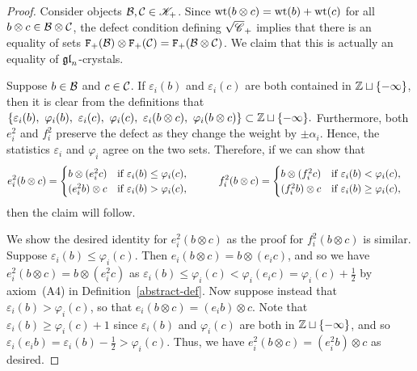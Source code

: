 \documentclass[11pt]{article}
\begin{document}
\begin{proof}
Consider objects $\cB,\cC\in \sK_+$.
Since $\weight(b\otimes c) = \weight(b) + \weight(c)$ for all $b\otimes c \in \cB\otimes \cC$, the defect condition defining $\sqrt{\sC}_+$ implies that there is an equality of sets $ \defectF{2}(\cB) \otimes \defectF{2}(\cC) = \defectF{2}(\cB\otimes \cC)$.
We claim that this is actually an equality of $\gl_n$-crystals.

Suppose $b \in \cB$ and $c\in \cC$. If $\varepsilon_i(b)$ and $\varepsilon_i(c)$ are both contained in $\ZZ \sqcup\{-\infty\}$, then it is clear from the definitions that
$
\{\varepsilon_i(b),\ \varphi_i(b),\ \varepsilon_i(c),\ \varphi_i(c),\ \varepsilon_i(b\otimes c),\ \varphi_i(b\otimes c) \} \subset \ZZ \sqcup \{-\infty\}.
$ 
Furthermore, both $e_i^2$ and $f_i^2$ preserve the defect as they change the weight by $\pm \alpha_i$.
Hence, the statistics $\varepsilon_i$ and $\varphi_i$ agree on the two sets.
Therefore, if we can show that
\[
\ba
e_i^2(b\otimes c) &= \begin{cases}
b \otimes (e_i^2c) &\text{if } \varepsilon_i(b) \leq \varphi_i(c), \\
(e_i^2b) \otimes c &\text{if } \varepsilon_i(b) > \varphi_i(c),
\end{cases}
& \qquad
f_i^2(b\otimes c) &= \begin{cases}
b \otimes (f_i^2c) &\text{if } \varepsilon_i(b) < \varphi_i(c), \\
(f_i^2b) \otimes c &\text{if } \varepsilon_i(b) \geq \varphi_i(c),
\end{cases}
\ea
\]
then the claim will follow.

We show the desired identity for $e_i^2(b \otimes c)$ as the proof for $f_i^2(b \otimes c)$ is similar.
Suppose $\varepsilon_i(b) \leq \varphi_i(c)$. Then $e_i(b \otimes c) = b \otimes (e_i c)$, and so we have $e_i^2(b \otimes c) = b \otimes (e_i^2 c)$ as $\varepsilon_i(b) \leq \varphi_i(c) < \varphi_i(e_i c) = \varphi_i(c) + \frac{1}{2}$ by axiom~(A4) in Definition~\ref{abstract-def}.
Now suppose instead that $\varepsilon_i(b) > \varphi_i(c)$, so that $e_i(b \otimes c) = (e_i b) \otimes c$.
Note that $\varepsilon_i(b) \geq  \varphi_i(c) + 1$ since $\varepsilon_i(b)$ and $\varphi_i(c)$ are both in $\ZZ\sqcup\{-\infty\}$, and so $\varepsilon_i(e_i b) = \varepsilon_i(b) - \frac{1}{2} > \varphi_i(c)$.
Thus, we have $e_i^2(b \otimes c) = (e_i^2 b) \otimes c$ as desired.
\end{proof}
\end{document}

